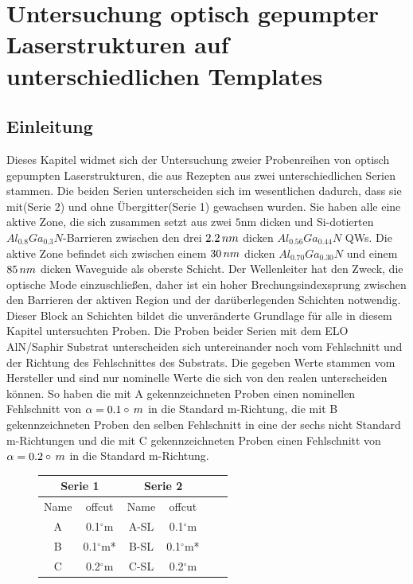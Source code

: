 
\thispagestyle{fancy}
\justifying
\chapter{Untersuchung optisch gepumpter Laserstrukturen auf unterschiedlichen Templates}
\label{chap:offcut}

\section{Einleitung}
Dieses Kapitel widmet sich der Untersuchung zweier Probenreihen von optisch gepumpten Laserstrukturen, die aus Rezepten aus zwei unterschiedlichen Serien stammen. Die beiden Serien unterscheiden sich im wesentlichen dadurch, dass sie mit(Serie 2) und ohne Übergitter(Serie 1) gewachsen wurden. Sie haben alle eine aktive Zone, die sich zusammen setzt aus zwei $5$nm dicken und Si-dotierten $ Al_{0.8}Ga_{0.3}N$-Barrieren zwischen den drei $2.2 \thinspace nm$ dicken $ Al_{0.56}Ga_{0.44}N$ QWs. Die aktive Zone befindet sich zwischen einem $30 \thinspace nm$ dicken $ Al_{0.70}Ga_{0.30}N$ und einem $85 \thinspace nm$ dicken Waveguide als oberste Schicht. Der Wellenleiter hat den Zweck, die optische Mode einzuschließen, daher ist ein hoher Brechungsindexsprung zwischen den Barrieren der aktiven Region und der darüberlegenden Schichten notwendig.
\newline
Dieser Block an Schichten bildet die unveränderte Grundlage für alle in diesem Kapitel untersuchten Proben.
\newline
Die Proben beider Serien mit dem ELO AlN/Saphir Substrat unterscheiden sich untereinander noch vom Fehlschnitt und der Richtung des Fehlschnittes des Substrats. Die gegeben Werte stammen vom Hersteller und sind nur nominelle Werte die sich von den realen unterscheiden können. So haben die mit A gekennzeichneten Proben einen nominellen Fehlschnitt von $\alpha = 0.1\circ \thinspace m$ in die Standard m-Richtung, die mit B gekennzeichneten Proben den selben Fehlschnitt in eine der sechs nicht Standard m-Richtungen und die mit C gekennzeichneten Proben einen Fehlschnitt von $\alpha = 0.2\circ \thinspace m$ in die Standard m-Richtung. 
\begin{figure}[H]
\centering
\begin{tabular}{ |c|c|c|c|c|c|   }
\hline
\multicolumn{2}{|c|}{Serie 1} & \multicolumn{2}{c|}{Serie 2}  \\
\hline
Name & offcut&  Name & offcut  \\
\hline
A & 0.1$^\circ$m  & A-SL & 0.1$^\circ$m \\
B & 0.1$^\circ$m* & B-SL & 0.1$^\circ$m* \\
C & 0.2$^\circ$m  & C-SL & 0.2$^\circ$m \\
\hline
\end{tabular}
\end{figure}
